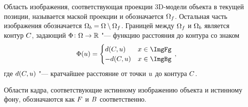 Область изображения, соответствующая проекции 3D-модели объекта
в текущей позиции, называется маской проекции и обозначается $\Omega_f$.
Остальная часть изображения обозначается
$\Omega_b = \Omega \setminus \Omega_f$.
Границей между $\Omega_f$ и $\Omega_b$ является контур $C$,
задающий
$\Phi \colon \Omega \to \mathbb{R}$ "---
функцию расстояния до контура со знаком
\begin{equation*}
    \CDist(\vect{u}) =
    \begin{cases}
        d(\Contour, \vect{u})  & x \in \ImgFg \\
        -d(\Contour, \vect{u})  & x \in \ImgBg
    \end{cases}
    \,\text{,}
\end{equation*}
где $d(C, \mathnormal{u})$ "--- кратчайшее расстояние от точки $\mathnormal{u}$
до контура $C$.

Области кадра, соответствующие истинному изображению объекта и истинному фону,
обозначаются как $F$ и $B$ соответственно.
